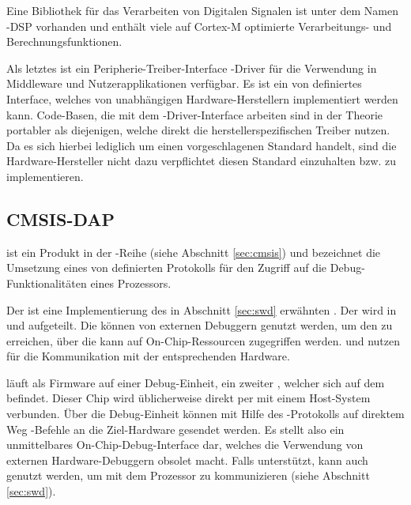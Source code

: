     Eine Bibliothek für das Verarbeiten von Digitalen Signalen ist unter dem Namen -DSP vorhanden und
    enthält viele auf Cortex-M optimierte Verarbeitungs- und Berechnungsfunktionen.

    Als letztes ist ein Peripherie-Treiber-Interface -Driver für die Verwendung in Middleware und
    Nutzerapplikationen verfügbar. Es ist ein von  definiertes Interface, welches von unabhängigen
    Hardware-Herstellern implementiert werden kann. Code-Basen, die mit dem -Driver-Interface arbeiten sind in der
    Theorie portabler als diejenigen, welche direkt die herstellerspezifischen Treiber
    nutzen. Da es sich hierbei lediglich um einen vorgeschlagenen Standard handelt, sind die Hardware-Hersteller nicht
    dazu verpflichtet diesen Standard einzuhalten bzw. zu implementieren.

	\subsection{CMSIS-DAP}
	\label{sec:cmsisdap}
	 ist ein Produkt in der -Reihe (siehe Abschnitt \ref{sec:cmsis}) und bezeichnet die Umsetzung eines
	von  definierten Protokolls für den Zugriff auf die Debug-Funktionalitäten eines Prozessors.

	Der  ist eine Implementierung des in Abschnitt \ref{sec:swd} erwähnten .
	Der  wird in  und  aufgeteilt.
	Die  können von externen Debuggern genutzt werden, um den  zu erreichen, über die  kann
	auf On-Chip-Ressourcen zugegriffen werden.  und  nutzen  für die Kommunikation mit der entsprechenden
	Hardware.

	 läuft als Firmware auf einer Debug-Einheit, ein zweiter , welcher sich auf dem  befindet.
	Dieser Chip wird üblicherweise direkt per  mit einem Host-System verbunden. Über die Debug-Einheit können
	mit Hilfe des -Protokolls auf direktem Weg -Befehle an die Ziel-Hardware gesendet werden. Es stellt
	also ein unmittelbares On-Chip-Debug-Interface dar, welches die Verwendung von externen Hardware-Debuggern obsolet
	macht. Falls unterstützt, kann auch  genutzt werden, um mit dem Prozessor zu
	kommunizieren (siehe Abschnitt \ref{sec:swd}).

